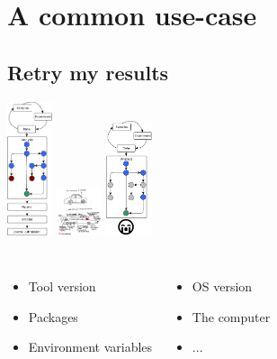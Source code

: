 \section{A common use-case}
\subsection{Retry my results}
\begin{frame}
\includegraphics[width=0.1\textwidth]{images/schema_soumission_fair.pdf}
\includegraphics[width=0.1\textwidth]{images/review.jpg}
\includegraphics[width=0.1\textwidth]{images/schema_soumission_fair_echec.pdf}
\begin{columns}
\begin{itemize}
	\item Tool version
	\item Packages
	\item Environment variables
\end{itemize}
\begin{itemize}
	\item OS version
	\item The computer 
	\item ...
\end{itemize}
\end{columns}
\end{frame}

